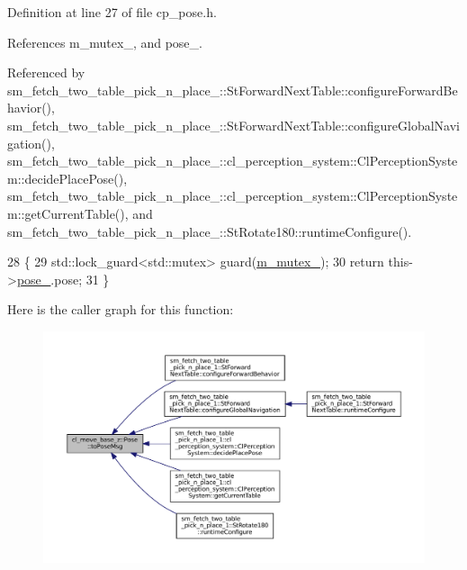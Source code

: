 Definition at line 27 of file cp\+\_\+pose.\+h.



References m\+\_\+mutex\+\_\+, and pose\+\_\+.



Referenced by sm\+\_\+fetch\+\_\+two\+\_\+table\+\_\+pick\+\_\+n\+\_\+place\+\_\+::\+St\+Forward\+Next\+Table\+::configure\+Forward\+Behavior(), sm\+\_\+fetch\+\_\+two\+\_\+table\+\_\+pick\+\_\+n\+\_\+place\+\_\+::\+St\+Forward\+Next\+Table\+::configure\+Global\+Navigation(), sm\+\_\+fetch\+\_\+two\+\_\+table\+\_\+pick\+\_\+n\+\_\+place\+\_\+::cl\+\_\+perception\+\_\+system\+::\+Cl\+Perception\+System\+::decide\+Place\+Pose(), sm\+\_\+fetch\+\_\+two\+\_\+table\+\_\+pick\+\_\+n\+\_\+place\+\_\+::cl\+\_\+perception\+\_\+system\+::\+Cl\+Perception\+System\+::get\+Current\+Table(), and sm\+\_\+fetch\+\_\+two\+\_\+table\+\_\+pick\+\_\+n\+\_\+place\+\_\+::\+St\+Rotate180\+::runtime\+Configure().


\begin{DoxyCode}
28     \{
29         std::lock\_guard<std::mutex> guard(\hyperlink{classcl__move__base__z_1_1Pose_a73ed2daba3e473e156cab751fb37b58f}{m\_mutex\_});
30         \textcolor{keywordflow}{return} this->\hyperlink{classcl__move__base__z_1_1Pose_a9da7acf880968a3c220b8436fd0bb6ef}{pose\_}.pose;
31     \}
\end{DoxyCode}
Here is the caller graph for this function\+:
\nopagebreak
\begin{figure}[H]
\begin{center}
\leavevmode
\includegraphics[width=350pt]{classcl__move__base__z_1_1Pose_a9faf8c6b437ff6b19c8bddd692908dca_icgraph}
\end{center}
\end{figure}
\mbox{\label{classcl__move__base__z_1_1Pose_a63887a88c1ac6e9a4a71b8d7d11aed6c}} 
